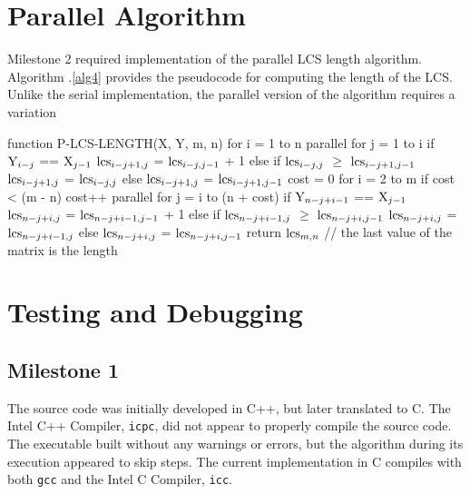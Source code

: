 \documentclass[usletter, 11pt]{extarticle}
\newcommand{\V}[1]{\textup{#1}}
\newcommand{\lcs}{\V{lcs}}
\newcommand{\seqone}{\V{X}}
\newcommand{\seqtwo}{\V{Y}}
\begin{document}
    \section{Parallel Algorithm} Milestone 2 required implementation of the
    parallel LCS length algorithm. Algorithm \thesection .\ref{alg4} provides
    the pseudocode for computing the length of the LCS. Unlike the serial
    implementation, the parallel version of the algorithm requires a variation


\begin{pseudocode}[caption={Parallel Longest Common Subsequence Length},
label={alg4}]
function P-LCS-LENGTH(X, Y, m, n)
    for i = 1 to n
        parallel for j = 1 to i
            if $\seqtwo_{i - j}$ == $\seqone_{j - 1}$
                $\lcs_{i - j + 1, j}$ = $\lcs_{i - j, j - 1}$ + 1
            else if $\lcs_{i - j, j}$ $\ge$ $\lcs_{i - j + 1, j - 1}$
                $\lcs_{i - j + 1, j}$ = $\lcs_{i - j, j}$
            else
                $\lcs_{i - j + 1, j}$ = $\lcs_{i - j + 1, j - 1}$
    cost = 0
    for i = 2 to m
        if cost < (m - n)
            cost++
        parallel for j = i to (n + cost)
            if $\seqtwo_{n - j + i - 1}$ == $\seqone_{j - 1}$
                $\lcs_{n - j + i, j}$ = $\lcs_{n - j + i - 1, j - 1}$ + 1
            else if $\lcs_{n - j + i - 1, j}$ $\ge$ $\lcs_{n - j + i, j - 1}$
                $\lcs_{n - j + i, j}$ = $\lcs_{n - j + i - 1, j}$
            else
                $\lcs_{n - j + i, j}$ = $\lcs_{n - j + i, j - 1}$
    return $\lcs_{m,n}$  // the last value of the matrix is the length

\end{pseudocode}

    \section{Testing and Debugging} 

        \subsection{Milestone 1} The source code was initially developed in
        C++, but later translated to C. The Intel C++ Compiler, \texttt{icpc},
        did not appear to properly compile the source code. The executable
        built without any warnings or errors, but the algorithm during its
        execution appeared to skip steps. The current implementation in C
        compiles with both \texttt{gcc} and the Intel C Compiler, \texttt{icc}.
\end{document}
